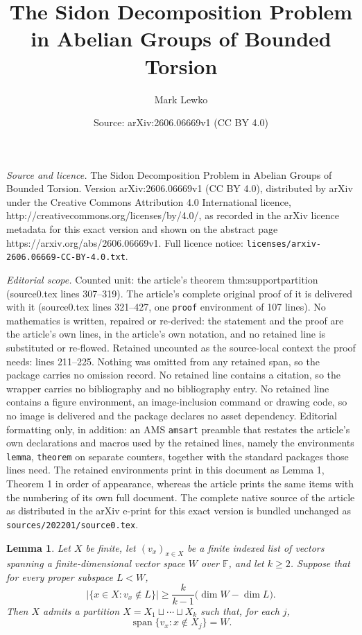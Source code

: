 \documentclass[10pt,a4paper]{amsart}
\title{The Sidon Decomposition Problem in Abelian Groups of Bounded Torsion}
\author{Mark Lewko}
\date{Source: arXiv:2606.06669v1 (CC BY 4.0)}
\newtheorem{lemma}{Lemma}
\newcommand{\F}{\mathbb{F}}
\DeclareMathOperator{\Span}{span}
\begin{document}
\maketitle

\noindent\emph{Source and licence.} The Sidon Decomposition Problem in Abelian Groups of Bounded Torsion. Version arXiv:2606.06669v1 (CC BY 4.0), distributed by arXiv under the Creative Commons Attribution 4.0 International licence, http://creativecommons.org/licenses/by/4.0/, as recorded in the arXiv licence metadata for this exact version and shown on the abstract page https://arxiv.org/abs/2606.06669v1. Full licence notice: \texttt{licenses/arxiv-2606.06669-CC-BY-4.0.txt}.\par\smallskip

\noindent\textit{Editorial scope.} Counted unit: the article's theorem thm:supportpartition (source0.tex lines 307--319). The article's complete original proof of it is delivered with it (source0.tex lines 321--427, one \texttt{proof} environment of 107 lines). No mathematics is written, repaired or re-derived: the statement and the proof are the article's own lines, in the article's own notation, and no retained line is substituted or re-flowed.  Retained uncounted as the source-local context the proof needs: lines 211--225.  Nothing was omitted from any retained span, so the package carries no omission record.  No retained line contains a citation, so the wrapper carries no bibliography and no bibliography entry.  No retained line contains a figure environment, an image-inclusion command or drawing code, so no image is delivered and the package declares no asset dependency.  Editorial formatting only, in addition: an AMS \texttt{amsart} preamble that restates the article's own declarations and macros used by the retained lines, namely the environments \texttt{lemma}, \texttt{theorem} on separate counters, together with the standard packages those lines need.  The retained environments print in this document as Lemma 1, Theorem 1 in order of appearance, whereas the article prints the same items with the numbering of its own full document.  The complete native source of the article as distributed in the arXiv e-print for this exact version is bundled unchanged as \texttt{sources/202201/source0.tex}.
\begin{lemma}\label{lem:complement-radohorn}
Let $X$ be finite, let $(v_x)_{x\in X}$ be a finite indexed list of vectors
spanning a finite-dimensional vector space $W$ over $\F$, and let $k\geq 2$.
Suppose that for every proper subspace $L<W$,
$$
        |\{x\in X:v_x\notin L\}|
        \geq
        \frac{k}{k-1}\bigl(\dim W-\dim L\bigr).
$$
Then $X$ admits a partition $X=X_1\sqcup\cdots\sqcup X_k$ such that, for each
$j$,
$$
        \Span\{v_x:x\notin X_j\}=W.
$$
\end{lemma}
\end{document}

